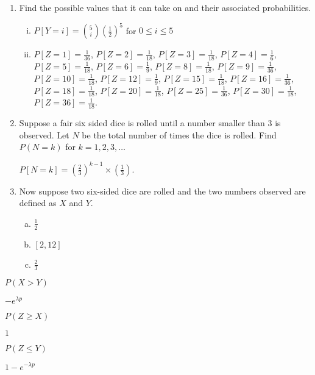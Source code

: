 \documentclass[11pt]{article}
\begin{document}
\begin{enumerate}[1]

    \item Find the possible values that it can take on and their associated probabilities.
    \begin{Answer}
        \begin{enumerate}[(i)]
            \item $P[Y = i] = {5 \choose i} (\frac{1}{2})^5$ for $0 \leq i \leq 5$
            \item $P[Z = 1] = \frac{1}{36}$, $P[Z = 2] = \frac{1}{18}$, $P[Z = 3] = \frac{1}{18}$, $P[Z = 4] = \frac{1}{6}$, $P[Z = 5] = \frac{1}{18}$, $P[Z = 6] = \frac{1}{9}$, $P[Z = 8] = \frac{1}{18}$, $P[Z = 9] = \frac{1}{36}$, $P[Z = 10] = \frac{1}{18}$, $P[Z = 12] = \frac{1}{9}$, $P[Z = 15] = \frac{1}{18}$, $P[Z = 16] = \frac{1}{36}$, $P[Z = 18] = \frac{1}{18}$, $P[Z = 20] = \frac{1}{18}$, $P[Z = 25] = \frac{1}{36}$, $P[Z = 30] = \frac{1}{18}$, $P[Z = 36] = \frac{1}{18}$. 
        \end{enumerate}
    \end{Answer}
    
    \item Suppose a fair six sided dice is rolled until a number smaller than 3 is observed. Let $N$ be the total number of times the dice is rolled. Find $P(N = k)$ for $k = 1,2,3,\ldots$
    \begin{Answer}
        $P[N = k] = (\frac{2}{3})^{k - 1} \times (\frac{1}{3})$.  
    \end{Answer}
    
    \item Now suppose two six-sided dice are rolled and the two numbers observed are defined as $X$ and $Y$. 
    \begin{Answer}
        \begin{enumerate}[(a)]
            \item $\frac{1}{2}$
            \item $[2,12]$
            \item $\frac{2}{3}$
        \end{enumerate}
    \end{Answer}

\end{enumerate}

\newpage
{}

\begin{Parts}

    \Part $P(X > Y)$

    \begin{Answer}
        $-e^{\lambda p}$
    \end{Answer}

    \Part $P(Z \geq X)$
    \begin{Answer}
        $1$
    \end{Answer}

    \Part $P(Z \leq Y)$
    \begin{Answer}
        $1 - e^{-\lambda p}$
    \end{Answer}

\end{Parts}
\end{document}
